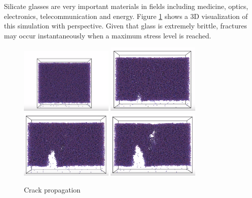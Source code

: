 Silicate glasses are very important materials in fields including medicine, optics, electronics, telecommunication and energy.  Figure \ref{crack_prop} shows a 3D visualization of this simulation with perspective. Given that glass is extremely brittle, fractures may occur instantaneously when a maximum stress level is reached.
\bigskip
\begin{figure}
    \centering
    \noindent
\includegraphics[width=0.4\textwidth]{picture/frac_prop1.PNG}\hspace{0.2\textwidth}%
\includegraphics[width=0.4\textwidth]{picture/frac_prop2.PNG}\\[2em]
\includegraphics[width=0.4\textwidth]{picture/frac_prop3.PNG}\hspace{0.2\textwidth}%
\includegraphics[width=0.4\textwidth]{picture/frac_prop4.PNG}\par
    \caption{Crack propagation}
    \label{crack_prop}
\end{figure}


